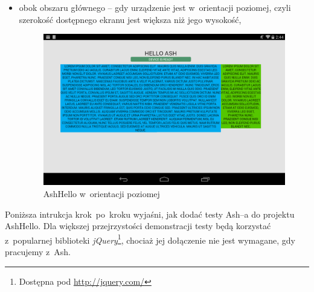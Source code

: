 \documentclass[brudnopis]{xmgr}
\begin{document}
\begin{itemize}
  \item obok obszaru głównego -- gdy urządzenie jest w~orientacji poziomej, czyli szerokość dostępnego ekranu jest większa niż jego wysokość,

\begin{figure}[h]
    \centering
    \includegraphics[scale=0.25]{hello2.png}
    \caption{AshHello w~orientacji poziomej}
    \label{fig:AshHello2}
\end{figure}
\end{itemize}

Poniższa intrukcja krok~po~kroku wyjaśni, jak dodać testy Ash--a do projektu AshHello. Dla większej przejrzystości demonstracji testy będą korzystać z~popularnej biblioteki \textit{jQuery}\footnote{Dostępna pod \url{http://jquery.com/}}, chociaż jej dołączenie nie jest wymagane, gdy pracujemy z~Ash.  
\end{document}
